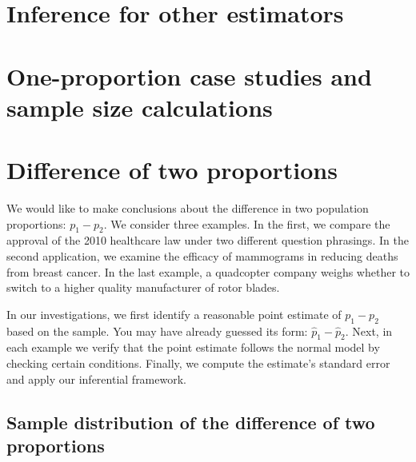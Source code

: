 \section{Inference for other estimators}











\section{One-proportion case studies and sample size calculations}
\label{one_prop_case_studies_and_sample_size_calculations}











\section[Difference of two proportions]{Difference of two proportions ~}
\label{differenceOfTwoProportions}

We would like to make conclusions about the difference in two population proportions: \mbox{$p_1 - p_2$}. We consider three examples. In the first, we compare the approval of the 2010 healthcare law under two different question phrasings. In the second application, we examine the efficacy of mammograms in reducing deaths from breast cancer. In the last example, a quadcopter company weighs whether to switch to a higher quality manufacturer of rotor blades.

In our investigations, we first identify a reasonable point estimate of $p_1 - p_2$ based on the sample. You may have already guessed its form: $\hat{p}_1 - \hat{p}_2$. Next, in each example we verify that the point estimate follows the normal model by checking certain conditions. Finally, we compute the estimate's standard error and apply our inferential framework.


\subsection{Sample distribution of the difference of two proportions}

